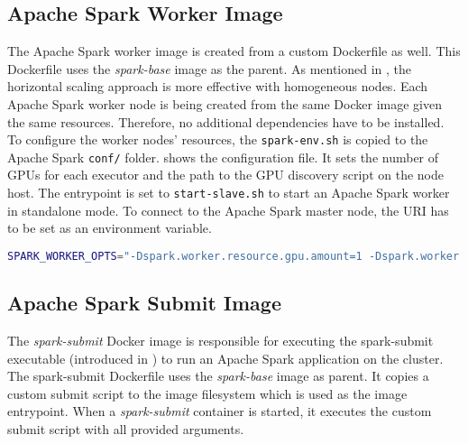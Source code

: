 \subsection{Apache Spark Worker Image}
The Apache Spark worker image is created from a custom Dockerfile as well.
%
This Dockerfile uses the \textit{spark-base} image as the parent.
As mentioned in , the horizontal scaling approach is more effective with homogeneous nodes. Each Apache Spark worker node is being created from the same Docker image given the same resources.
%
Therefore, no additional dependencies have to be installed.
%
To configure the worker nodes' resources, the \texttt{spark-env.sh} is copied to the Apache Spark \texttt{conf/} folder.  shows the configuration file. It sets the number of GPUs for each executor and the path to the GPU discovery script on the node host.
%
The entrypoint is set to \texttt{start-slave.sh} to start an Apache Spark worker in standalone mode. To connect to the Apache Spark master node, the URI has to be set as an environment variable.
\begin{lstlisting}[label=lst:06_env_depl_worker-env, caption=Environment configuration for all worker nodes, language=sh, numbers=none]
SPARK_WORKER_OPTS="-Dspark.worker.resource.gpu.amount=1 -Dspark.worker.resource.gpu.discoveryScript=/opt/sparkRapidsPlugin/getGpusResources.sh"
\end{lstlisting}


\subsection{Apache Spark Submit Image}
The \textit{spark-submit} Docker image is responsible for executing the spark-submit executable (introduced in ) to run an Apache Spark application on the cluster.
The spark-submit Dockerfile uses the \textit{spark-base} image as parent.
It copies a custom submit script to the image filesystem which is used as the image entrypoint. When a \textit{spark-submit} container is started, it executes the custom submit script with all provided arguments.


